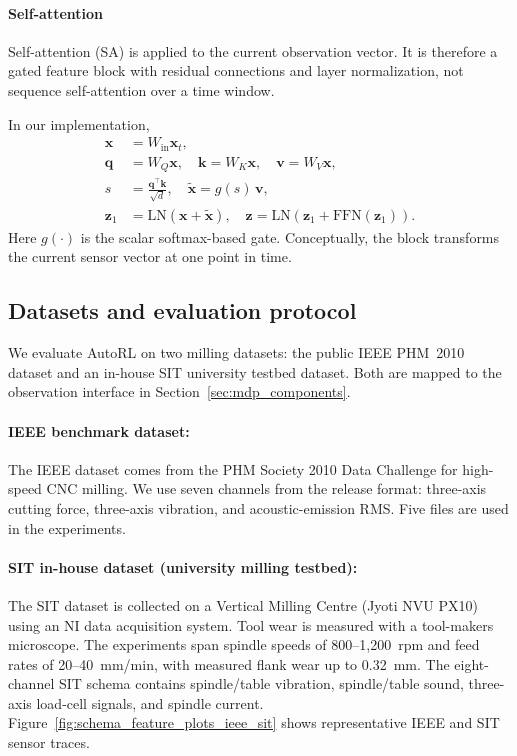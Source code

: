 \documentclass[sn-basic]{sn-jnl}%
\begin{document}
\paragraph{Self-attention}
Self-attention (SA) is applied to the current observation vector. It is therefore a gated feature block with residual connections and layer normalization, not sequence self-attention over a time window.

In our implementation,
\begin{align}
        \mathbf{x} &= W_{\mathrm{in}}\mathbf{x}_t,\\
        \mathbf{q} &= W_Q\mathbf{x},\quad \mathbf{k}=W_K\mathbf{x},\quad \mathbf{v}=W_V\mathbf{x},\\
        s &= \frac{\mathbf{q}^\top\mathbf{k}}{\sqrt{d}},\quad \tilde{\mathbf{x}} = g(s)\,\mathbf{v},\\
        \mathbf{z}_1 &= \mathrm{LN}\!\left(\mathbf{x}+\tilde{\mathbf{x}}\right),\quad
        \mathbf{z}=\mathrm{LN}\!\left(\mathbf{z}_1+\mathrm{FFN}(\mathbf{z}_1)\right).
\end{align}
Here $g(\cdot)$ is the scalar softmax-based gate. Conceptually, the block transforms the current sensor vector at one point in time.
\subsection{Datasets and evaluation protocol} \label{sec:experiment} 

We evaluate AutoRL on two milling datasets: the public IEEE PHM~2010 dataset and an in-house SIT university testbed dataset. Both are mapped to the observation interface in Section~\ref{sec:mdp_components}.%

\paragraph{IEEE benchmark dataset:}
The IEEE dataset \cite{PHMdata2010} comes from the PHM Society 2010 Data Challenge for high-speed CNC milling. We use seven channels from the release format: three-axis cutting force, three-axis vibration, and acoustic-emission RMS. Five files are used in the experiments.

\paragraph{SIT in-house dataset (university milling testbed):}
The SIT dataset is collected on a Vertical Milling Centre (Jyoti NVU PX10) using an NI data acquisition system. Tool wear is measured with a tool-makers microscope. The experiments span spindle speeds of 800--1{,}200~rpm and feed rates of 20--40~mm/min, with measured flank wear up to 0.32~mm. The eight-channel SIT schema contains spindle/table vibration, spindle/table sound, three-axis load-cell signals, and spindle current. Figure~\ref{fig:schema_feature_plots_ieee_sit} shows representative IEEE and SIT sensor traces.
\end{document}
